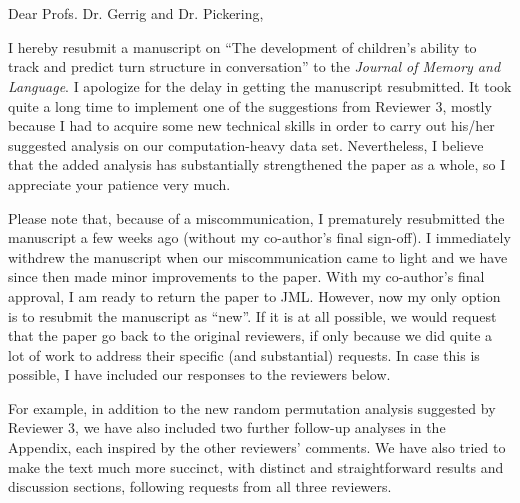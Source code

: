 \documentclass[11pt,a4paper]{letter} %
\def\opening#1{\thispagestyle{empty}
{\centering\fromaddress \vspace{0.6in} \\ %
\hspace*{\longindentation}\hspace*{\fill}\par} %
{\raggedright \toname \\ \toaddress \par} %
\vspace{0.4in} %
\noindent #1 %
}
\begin{document}

\begin{letter}{}


\opening{Dear Profs.  Dr. Gerrig and Dr. Pickering,}

\smallskip

\noindent I hereby resubmit a manuscript on ``The development of children's ability to track and predict turn structure in conversation'' to the \textit{Journal of Memory and Language}. I apologize for the delay in getting the manuscript resubmitted. It took quite a long time to implement one of the suggestions from Reviewer 3, mostly because I had to acquire some new technical skills in order to carry out his/her suggested analysis on our computation-heavy data set. Nevertheless, I believe that the added analysis has substantially strengthened the paper as a whole, so I appreciate your patience very much.

\noindent Please note that, because of a miscommunication, I prematurely resubmitted the manuscript a few weeks ago (without my co-author's final sign-off). I immediately withdrew the manuscript when our miscommunication came to light and we have since then made minor improvements to the paper. With my co-author's final approval, I am ready to return the paper to JML. However, now my only option is to resubmit the manuscript as ``new''. If it is at all possible, we would request that the paper go back to the original reviewers, if only because we did quite a lot of work to address their specific (and substantial) requests. In case this is possible, I have included our responses to the reviewers below.

\noindent For example, in addition to the new random permutation analysis suggested by Reviewer 3, we have also included two further follow-up analyses in the Appendix, each inspired by the other reviewers' comments. We have also tried to make the text much more succinct, with distinct and straightforward results and discussion sections, following requests from all three reviewers. 


\end{letter}
\end{document}
